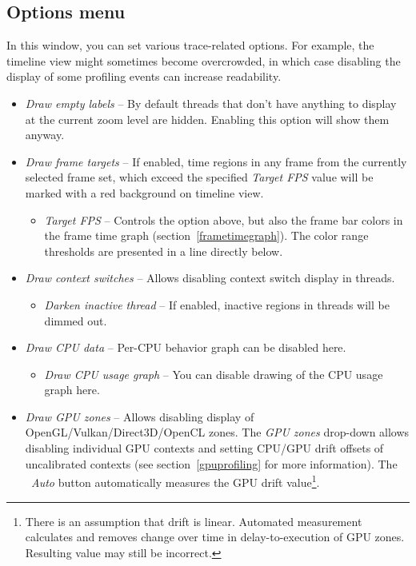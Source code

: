 \documentclass[hidelinks,titlepage,a4paper,twoside]{article}
\begin{document}
\subsection{Options menu}
\label{options}

In this window, you can set various trace-related options. For example, the timeline view might sometimes become overcrowded, in which case disabling the display of some profiling events can increase readability.

\begin{itemize}
\item \emph{\faExpand{} Draw empty labels} -- By default threads that don't have anything to display at the current zoom level are hidden. Enabling this option will show them anyway.
\item \emph{\faFlagCheckered{} Draw frame targets} -- If enabled, time regions in any frame from the currently selected frame set, which exceed the specified \emph{Target FPS} value will be marked with a red background on timeline view.
\begin{itemize}
\item \emph{Target FPS} -- Controls the option above, but also the frame bar colors in the frame time graph (section~\ref{frametimegraph}). The color range thresholds are presented in a line directly below.
\end{itemize}
\item \emph{\faHiking{} Draw context switches} -- Allows disabling context switch display in threads.
\begin{itemize}
\item \emph{\faMoon{} Darken inactive thread} -- If enabled, inactive regions in threads will be dimmed out.
\end{itemize}
\item \emph{\faSlidersH{} Draw CPU data} -- Per-CPU behavior graph can be disabled here.
\begin{itemize}
\item \emph{\faSignature{} Draw CPU usage graph} -- You can disable drawing of the CPU usage graph here.
\end{itemize}
\item \emph{\faEye{} Draw GPU zones} -- Allows disabling display of OpenGL/Vulkan/Direct3D/OpenCL zones. The \emph{GPU zones} drop-down allows disabling individual GPU contexts and setting CPU/GPU drift offsets of uncalibrated contexts (see section~\ref{gpuprofiling} for more information). The \emph{\faRobot~Auto} button automatically measures the GPU drift value\footnote{There is an assumption that drift is linear. Automated measurement calculates and removes change over time in delay-to-execution of GPU zones. Resulting value may still be incorrect.}.

\end{itemize}
\end{document}
